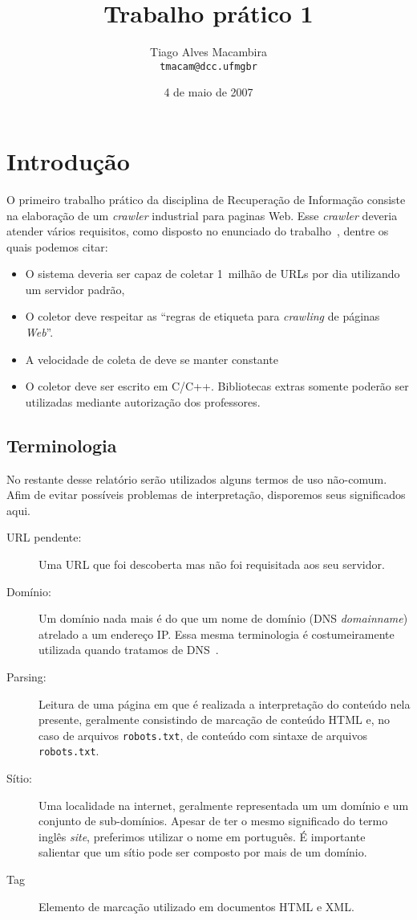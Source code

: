\documentclass[10pt,twocolumn]{article}
\title{Trabalho prático 1}
\author{Tiago Alves Macambira \\ \texttt{tmacam@dcc.ufmgbr}}
\date{4 de maio de 2007}
\begin{document}
\maketitle

\section{Introdução}

O primeiro trabalho prático da disciplina de Recuperação de Informação
consiste na elaboração de um \emph{crawler} industrial para paginas Web.
Esse \emph{crawler} deveria atender vários requisitos, como disposto no
enunciado do trabalho~\cite{tp1}, dentre os quais podemos citar:
\begin{itemize}
\item O sistema deveria ser capaz de coletar 1~milhão de URLs por dia
utilizando um servidor padrão,
\item O coletor deve respeitar as ``regras de etiqueta para
\emph{crawling} de páginas \emph{Web}''.
\item A velocidade de coleta de deve se manter constante
\item O coletor deve ser escrito em C/C++. Bibliotecas extras somente
poderão ser utilizadas mediante autorização dos professores.
\end{itemize}

\subsection{Terminologia}

No restante desse relatório serão utilizados alguns termos de uso
não-comum. Afim de evitar possíveis problemas de interpretação,
disporemos seus significados aqui.

\begin{description}
\item[URL pendente:] Uma URL que foi descoberta mas não foi requisitada aos seu
servidor.
\item[Domínio:] Um domínio nada mais é do que um nome de domínio
(DNS \emph{domainname}) atrelado a um
endereço IP. Essa mesma terminologia é costumeiramente utilizada quando
tratamos de DNS~\cite{rfc1034}.
\item[Parsing:] Leitura de uma página em que é realizada a interpretação do
conteúdo nela presente, geralmente consistindo de marcação de conteúdo HTML e,
no caso de arquivos \texttt{robots.txt}, de conteúdo com sintaxe de arquivos
\texttt{robots.txt}.
\item[Sítio:] Uma localidade na internet, geralmente representada um um domínio
e um conjunto de sub-domínios. Apesar de ter o mesmo significado do termo
inglês \emph{site}, preferimos utilizar o nome em português. É importante
salientar que um sítio pode ser composto por mais de um domínio.
\item[Tag] Elemento de marcação utilizado em documentos HTML e XML.
\end{description}
\end{document}
